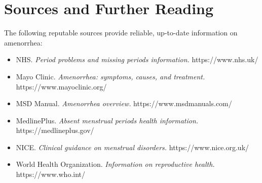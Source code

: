 \section*{Sources and Further Reading}
The following reputable sources provide reliable, up-to-date information on amenorrhea:

\begin{itemize}
    \item NHS. \textit{Period problems and missing periods information.} https://www.nhs.uk/
    \item Mayo Clinic. \textit{Amenorrhea: symptoms, causes, and treatment.} https://www.mayoclinic.org/
    \item MSD Manual. \textit{Amenorrhea overview.} https://www.msdmanuals.com/
    \item MedlinePlus. \textit{Absent menstrual periods health information.} https://medlineplus.gov/
    \item NICE. \textit{Clinical guidance on menstrual disorders.} https://www.nice.org.uk/
    \item World Health Organization. \textit{Information on reproductive health.} https://www.who.int/
\end{itemize}

